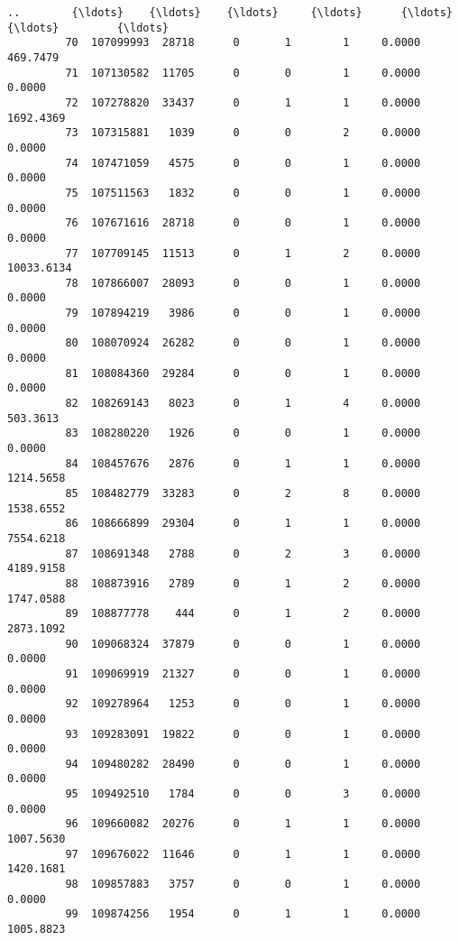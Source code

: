 \documentclass[11pt]{article}
\begin{document}
\begin{Verbatim}[commandchars=\\\{\}]
         ..        {\ldots}    {\ldots}    {\ldots}     {\ldots}      {\ldots}        {\ldots}         {\ldots}   
         70  107099993  28718      0       1        1     0.0000    469.7479   
         71  107130582  11705      0       0        1     0.0000      0.0000   
         72  107278820  33437      0       1        1     0.0000   1692.4369   
         73  107315881   1039      0       0        2     0.0000      0.0000   
         74  107471059   4575      0       0        1     0.0000      0.0000   
         75  107511563   1832      0       0        1     0.0000      0.0000   
         76  107671616  28718      0       0        1     0.0000      0.0000   
         77  107709145  11513      0       1        2     0.0000  10033.6134   
         78  107866007  28093      0       0        1     0.0000      0.0000   
         79  107894219   3986      0       0        1     0.0000      0.0000   
         80  108070924  26282      0       0        1     0.0000      0.0000   
         81  108084360  29284      0       0        1     0.0000      0.0000   
         82  108269143   8023      0       1        4     0.0000    503.3613   
         83  108280220   1926      0       0        1     0.0000      0.0000   
         84  108457676   2876      0       1        1     0.0000   1214.5658   
         85  108482779  33283      0       2        8     0.0000   1538.6552   
         86  108666899  29304      0       1        1     0.0000   7554.6218   
         87  108691348   2788      0       2        3     0.0000   4189.9158   
         88  108873916   2789      0       1        2     0.0000   1747.0588   
         89  108877778    444      0       1        2     0.0000   2873.1092   
         90  109068324  37879      0       0        1     0.0000      0.0000   
         91  109069919  21327      0       0        1     0.0000      0.0000   
         92  109278964   1253      0       0        1     0.0000      0.0000   
         93  109283091  19822      0       0        1     0.0000      0.0000   
         94  109480282  28490      0       0        1     0.0000      0.0000   
         95  109492510   1784      0       0        3     0.0000      0.0000   
         96  109660082  20276      0       1        1     0.0000   1007.5630   
         97  109676022  11646      0       1        1     0.0000   1420.1681   
         98  109857883   3757      0       0        1     0.0000      0.0000   
         99  109874256   1954      0       1        1     0.0000   1005.8823   
         

\end{Verbatim}
\end{document}
